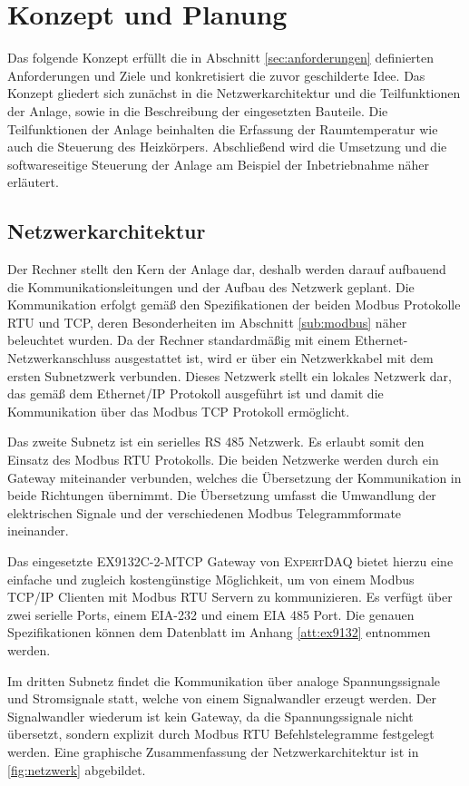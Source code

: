 \section{Konzept und Planung}
 
Das folgende Konzept erfüllt die in Abschnitt  \ref{sec:anforderungen} definierten Anforderungen und Ziele und konkretisiert die zuvor geschilderte Idee. Das Konzept gliedert sich zunächst in die Netzwerkarchitektur und die Teilfunktionen der Anlage, sowie in die Beschreibung der eingesetzten Bauteile. Die Teilfunktionen der Anlage beinhalten die Erfassung der Raumtemperatur wie auch die Steuerung des Heizkörpers. Abschließend wird die Umsetzung und die softwareseitige Steuerung der Anlage am Beispiel der Inbetriebnahme näher erläutert.

\subsection{Netzwerkarchitektur}

Der Rechner stellt den Kern der Anlage dar, deshalb werden darauf aufbauend die Kommunikationsleitungen und der Aufbau des Netzwerk geplant. Die Kommunikation erfolgt gemäß den Spezifikationen der beiden Modbus Protokolle RTU und TCP, deren Besonderheiten im Abschnitt \ref{sub:modbus} näher beleuchtet wurden. Da der Rechner standardmäßig mit einem Ethernet-Netzwerkanschluss ausgestattet ist, wird er über ein Netzwerkkabel mit dem ersten Subnetzwerk verbunden. Dieses Netzwerk stellt ein lokales Netzwerk dar, das gemäß dem Ethernet/IP Protokoll ausgeführt ist und damit die Kommunikation über das Modbus TCP Protokoll ermöglicht.

Das zweite Subnetz ist ein serielles RS 485 Netzwerk. Es erlaubt somit den Einsatz des Modbus RTU Protokolls. Die beiden Netzwerke werden durch ein Gateway miteinander verbunden, welches die Übersetzung der Kommunikation in beide Richtungen übernimmt. Die Übersetzung umfasst die Umwandlung der elektrischen Signale und der verschiedenen Modbus Telegrammformate ineinander.

Das eingesetzte \textsc{EX9132C-2-MTCP} Gateway von \textsc{ExpertDAQ} bietet hierzu eine einfache und zugleich kostengünstige Möglichkeit, um von einem Modbus TCP/IP Clienten mit Modbus RTU Servern zu kommunizieren. Es verfügt über zwei serielle Ports, einem EIA-232 und einem EIA 485 Port. Die genauen Spezifikationen können dem Datenblatt im Anhang \ref{att:ex9132} entnommen werden.

Im dritten Subnetz findet die Kommunikation über analoge Spannungssignale und Stromsignale statt, welche von einem Signalwandler erzeugt werden. Der Signalwandler wiederum ist kein Gateway, da die Spannungssignale nicht übersetzt, sondern explizit durch Modbus RTU Befehlstelegramme festgelegt werden. Eine graphische Zusammenfassung der Netzwerkarchitektur ist in \ref{fig:netzwerk} abgebildet.

